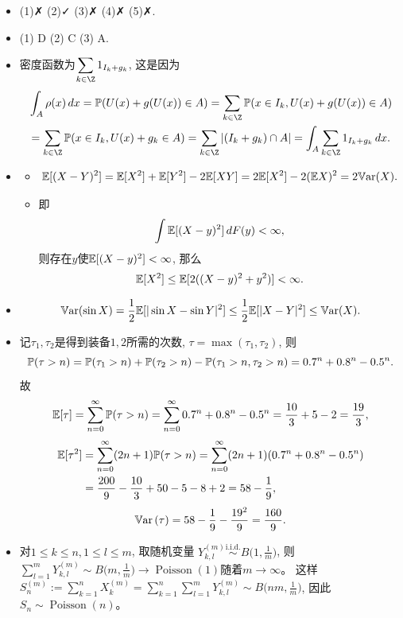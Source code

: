 \begin{itemize}
    \item [一、](1)✗ (2)✓ (3)✗ (4)✗ (5)✗.

    \item [二、](1) D (2) C (3) A.

    \item [三、]
    密度函数为$\displaystyle \sum_{k\in\Z}1_{I_k+g_k}$, 这是因为
    \begin{align*}&\int_A\rho(x)\,dx=\p(U(x)+g(U(x))\in A)
    =\sum_{k\in\Z}\p(x\in I_k,U(x)+g(U(x))\in A)\\
    &=\sum_{k\in\Z}\p(x\in I_k,U(x)+g_k\in A)
    =\sum_{k\in\Z}|(I_k+g_k)\cap A|
    =\int_A\sum_{k\in\Z}1_{I_k+g_k}\,dx.\end{align*}

    \item [四、]
    \begin{itemize}
        \item[(1)]
        $$\mathbb{E}[(X-Y)^2] = \mathbb{E}[X^2]+\mathbb{E}[Y^2]-2\mathbb{E}[XY] 
        = 2\mathbb{E}[X^2]-2(\mathbb{E} X)^2 = 2\mathbb{V}\mathrm{ar}(X).$$
        \item[(2)]
        即$$\int\mathbb{E}[(X-y)^2]\,dF(y)<\infty,$$
        则存在$y$使$\mathbb{E}[(X-y)^2]<\infty$, 那么
        $$\mathbb{E}[X^2]\le\mathbb{E}[2((X-y)^2+y^2)]<\infty.$$
    \end{itemize}

    \item [五、]
    $$\mathbb{V}\mathrm{ar}(\sin X)=\frac12\mathbb{E}[|\sin X-\sin Y|^2]
    \le\frac12\mathbb{E}[|X-Y|^2]\le \mathbb{V}\mathrm{ar}(X).$$

    \item [六、]
    记$\tau_1,\tau_2$是得到装备$1,2$所需的次数, $\tau=\max(\tau_1,\tau_2)$, 则
    \[\mathbb{P}(\tau>n)=\mathbb{P}(\tau_1>n)+\mathbb{P}(\tau_2>n)-\mathbb{P}(\tau_1>n,\tau_2>n)
    =0.7^n+0.8^n-0.5^n.\]
    故
    \[\mathbb{E}[\tau]=\sum_{n=0}^\infty\mathbb{P}(\tau>n)
    =\sum_{n=0}^\infty0.7^n+0.8^n-0.5^n=\frac{10}{3}+5-2=\frac{19}{3},\]
    \begin{align*}\mathbb{E}[\tau^2]&=\sum_{n=0}^\infty(2n+1)\mathbb{P}(\tau>n)
        =\sum_{n=0}^\infty(2n+1)(0.7^n+0.8^n-0.5^n)\\
        &=\frac{200}{9}-\frac{10}{3}+50-5-8+2=58-\frac{1}{9},\end{align*}
    \[\mathbb{V}\mathrm{ar}\,(\tau)=58-\frac{1}{9}-\frac{19^2}{9}=\frac{160}{9}.\]

    \item [七、]
    对$1\le k\le n,1\le l\le m$, 取随机变量
    $Y_{k,l}^{(m)}\overset{\text{i.i.d.}}{\sim}B\big(1,\frac1m\big)$, 
    则$\sum\limits_{l=1}^mY_{k,l}^{(m)}\sim B\big(m,\frac1m\big)
    \to\operatorname{Poisson}(1)$随着$m\to\infty$。
    这样$S_n^{(m)}:=\sum\limits_{k=1}^nX_k^{(m)}
    =\sum\limits_{k=1}^n\sum\limits_{l=1}^mY_{k,l}^{(m)}\sim B\big(nm,\frac1m\big)$, 
    因此$S_n\sim\operatorname{Poisson}(n)$。
\end{itemize}